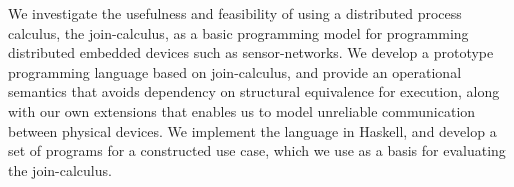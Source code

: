 We investigate the usefulness and feasibility of using a distributed process
calculus, the join-calculus, as a basic programming model for programming
distributed embedded devices such as sensor-networks. We develop a prototype
programming language based on join-calculus, and provide an operational
semantics that avoids dependency on structural equivalence for execution, along
with our own extensions that enables us to model unreliable communication
between physical devices. We implement the language in Haskell, and develop a
set of programs for a constructed use case, which we use as a basis for
evaluating the join-calculus.
